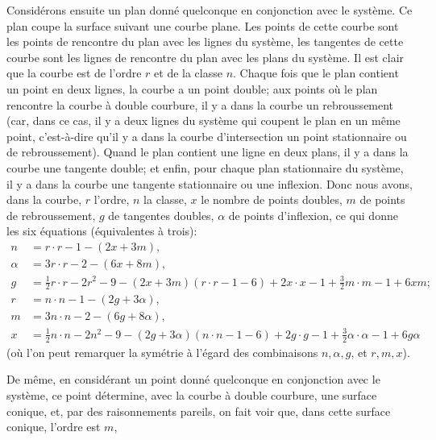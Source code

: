 \documentclass[11pt]{article}
\begin{document}
Consid\'erons ensuite un plan donn\'e quelconque en conjonction avec le syst\`eme. Ce plan coupe la surface suivant une courbe plane. Les points de cette courbe sont les points de rencontre du plan avec les lignes du syst\`eme, les tangentes de cette courbe sont les lignes de rencontre du plan avec les plans du syst\`eme. Il est clair que la courbe est de l'ordre $r$ et de la classe $n$. Chaque fois que le plan contient un point en deux lignes, la courbe a un point double; aux points o\`u le plan rencontre la courbe \`a double courbure, il y a dans la courbe un rebroussement (car, dans ce cas, il y a deux lignes du syst\`eme qui coupent le plan en un m\^eme point, c'est-\`a-dire qu'il y a dans la courbe d'intersection un point stationnaire ou de rebroussement). Quand le plan contient une ligne en deux plans, il y a dans la courbe une tangente double; et enfin, pour chaque plan stationnaire du syst\`eme, il y a dans la courbe une tangente stationnaire ou une inflexion. Donc nous avons, dans la courbe, $r$ l'ordre, $n$ la classe, $x$ le nombre de points doubles, $m$ de points de rebroussement, $g$ de tangentes doubles, $\alpha$ de points d'inflexion, ce qui donne les six \'equations (\'equivalentes \`a trois):
\begin{align*}
n &= r\cdot r - 1 - (2x + 3m),\\
\alpha &= 3r\cdot r - 2 - (6x + 8m),\\
g &= \tfrac12 r\cdot r - 2r^2 - 9 - (2x + 3m)(r\cdot r - 1 - 6) + 2x\cdot x - 1 + \tfrac32 m\cdot m - 1 + 6xm;\\
r &= n\cdot n - 1 - (2g + 3\alpha),\\
m &= 3n\cdot n - 2 - (6g + 8\alpha),\\
x &= \tfrac12 n\cdot n - 2n^2 - 9 - (2g + 3\alpha)(n\cdot n - 1 - 6) + 2g\cdot g - 1 + \tfrac32 \alpha\cdot\alpha - 1 + 6g\alpha
\end{align*}
(o\`u l'on peut remarquer la sym\'etrie \`a l'\'egard des combinaisons $n, \alpha, g$, et $r, m, x$).

De m\^eme, en consid\'erant un point donn\'e quelconque en conjonction avec le syst\`eme, ce point d\'etermine, avec la courbe \`a double courbure, une surface conique, et, par des raisonnements pareils, on fait voir que, dans cette surface conique, l'ordre est $m$,

\newpage
\setcounter{page}{210}
\end{document}
